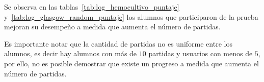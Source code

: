 Se observa en las tablas~\ref{tab:log_hemocultivo_puntaje}
y~\ref{tab:log_glasgow_random_puntaje} los alumnos que participaron de la prueba
mejoran su desempeño a medida que aumenta el número de partidas. 

Es importante notar que la cantidad de partidas no es uniforme entre los
alumnos, es decir hay alumnos con más de $10$ partidas y usuarios con menos de
$5$, por ello, no es posible demostrar que existe un progreso a medida que
aumenta el número de partidas.

